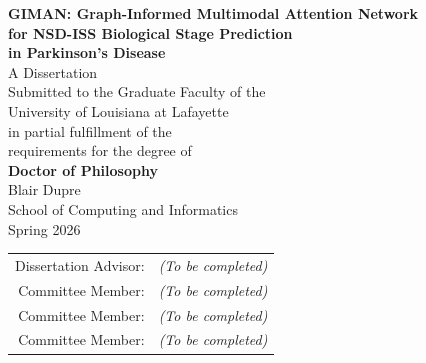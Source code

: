 \documentclass[12pt,oneside]{report}
\begin{document}
\begin{titlepage}
  \centering
  \vspace*{1in}
  {\Large\bfseries GIMAN: Graph-Informed Multimodal Attention Network\\[6pt]
   for NSD-ISS Biological Stage Prediction\\[6pt]
   in Parkinson's Disease}\\[1.5in]
  {\large A Dissertation}\\[0.3in]
  {\large Submitted to the Graduate Faculty of the\\
   University of Louisiana at Lafayette\\
   in partial fulfillment of the\\
   requirements for the degree of}\\[0.3in]
  {\large\bfseries Doctor of Philosophy}\\[0.5in]
  {\large Blair Dupre}\\[0.3in]
  {\large School of Computing and Informatics}\\[0.3in]
  {\large Spring 2026}\\[1in]
  \begin{tabular}{rl}
    Dissertation Advisor: & \textit{(To be completed)} \\
    Committee Member:     & \textit{(To be completed)} \\
    Committee Member:     & \textit{(To be completed)} \\
    Committee Member:     & \textit{(To be completed)} \\
  \end{tabular}
\end{titlepage}
\end{document}

